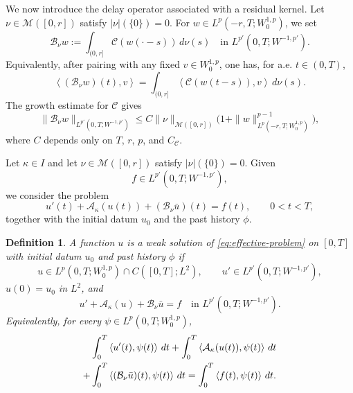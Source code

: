 \documentclass[a4paper,11pt,oneside,reqno]{amsart}
\newtheorem{definition}[theorem]{Definition}
\newcounter{c}
\newcounter{d}
\newcounter{b}
\newcommand{\dual}[2]{\left\langle #1,#2\right\rangle}
\newcommand{\M}{\mathcal{M}}
\begin{document}
We now introduce the delay operator associated with a residual kernel.
Let $\nu\in\M([0,r])$ satisfy $|\nu|(\{0\})=0$.
For $w\in L^p(-r,T;W^{1,p}_0)$, we set
\begin{equation}
 \mathcal B_\nu w
 :=
 \int_{(0,r]}\mathcal C(w(\cdot-s))\,d\nu(s)
 \quad\text{in }L^{p'}(0,T;W^{-1,p'}).
 \label{eq:Bnu-def}
\end{equation}
Equivalently, after pairing with any fixed $v\in W^{1,p}_0$, one has, for a.e. $t\in(0,T)$,
\begin{equation}
 \dual{(\mathcal B_\nu w)(t)}{v}
 =
 \int_{(0,r]}
 \dual{\mathcal C(w(t-s))}{v}\,d\nu(s).
 \label{eq:Bnu-dual-def}
\end{equation}
The growth estimate for $\mathcal C$ gives
\begin{equation}
 \|\mathcal B_\nu w\|_{L^{p'}(0,T;W^{-1,p'})}
 \le
 C\|\nu\|_{\M([0,r])}
 \bigl(1+\|w\|_{L^p(-r,T;W^{1,p}_0)}^{p-1}\bigr),
 \label{eq:Bnu-growth}
\end{equation}
where $C$ depends only on $T$, $r$, $p$, and $C_{\mathcal C}$.

Let $\kappa\in I$ and let $\nu\in\M([0,r])$ satisfy
$|\nu|(\{0\})=0$. Given
\[
 f\in L^{p'}(0,T;W^{-1,p'}),
\]
we consider the problem
\begin{equation}
 u'(t)+\mathcal A_\kappa(u(t))+(\mathcal B_\nu\bar u)(t)=f(t),
 \qquad 0<t<T,
 \label{eq:effective-problem}
\end{equation}
together with the initial datum $u_0$ and the past history $\phi$.
\begin{definition}\label{def:weak-solution}
A function $u$ is a weak solution of \eqref{eq:effective-problem} on
$[0,T]$ with initial datum $u_0$ and past history $\phi$ if
\[
 u\in L^p(0,T;W^{1,p}_0)\cap C([0,T];L^2),
 \qquad
 u'\in L^{p'}(0,T;W^{-1,p'}),
\]
$u(0)=u_0$ in $L^2$, and
\begin{equation}
 u'+\mathcal A_\kappa(u)+\mathcal B_\nu\bar u=f
 \quad\text{in }L^{p'}(0,T;W^{-1,p'}).
 \label{eq:weak-equation}
\end{equation}
Equivalently, for every $\psi\in L^p(0,T;W^{1,p}_0)$,
\begin{align}
 &\int_0^T\dual{u'(t)}{\psi(t)}\,dt
 +\int_0^T\dual{\mathcal A_\kappa(u(t))}{\psi(t)}\,dt
 \notag\\
 +&
 \int_0^T\dual{(\mathcal B_\nu\bar u)(t)}{\psi(t)}\,dt
 =
 \int_0^T\dual{f(t)}{\psi(t)}\,dt.
 \label{eq:weak-formulation}
\end{align}
\end{definition}
\end{document}
